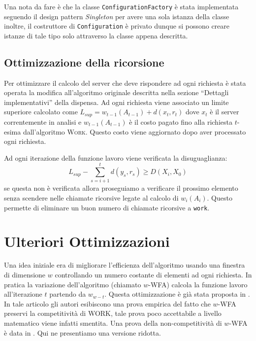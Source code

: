 \documentclass[a4paper, 10pt]{article}
\begin{document}
Una nota da fare è che la classe \texttt{ConfigurationFactory} è stata 
implementata seguendo il design pattern \emph{Singleton} per avere una sola
istanza della classe inoltre, il costruttore di \texttt{Configuration} è 
privato dunque si possono creare istanze di tale tipo solo attraverso la 
classe appena descritta. 

\subsection{Ottimizzazione della ricorsione}
Per ottimizzare il calcolo del server che deve rispondere ad ogni richiesta 
è stata operata la modifica all'algoritmo originale descritta nella sezione
``Dettagli implementativi'' della dispensa. Ad ogni richiesta viene associato
un limite superiore calcolato come $L_{sup} = w_{t - 1}(A_{t - 1}) + d(x_t, r_t)$ 
dove $x_t$ è il server correntemente in analisi e $w_{t - 1}(A_{t - 1})$ è il
costo pagato fino alla richiesta $t$-esima dall'algoritmo \textsc{Work}. Questo
costo viene aggiornato dopo aver processato ogni richiesta. 

Ad ogni iterazione della funzione lavoro viene verificata la disuguaglianza:
\[
  L_{sup} - \sum_{s = i + 1}^{t} d(y_s, r_s) \geq D(X_i, X_0)
\]
se questa non è verificata allora proseguiamo a verificare il prossimo elemento
senza scendere nelle chiamate ricorsive legate al calcolo di $w_i(A_i)$. Questo
permette di eliminare un buon numero di chiamate ricorsive a \texttt{work}. 

\section{Ulteriori Ottimizzazioni}
Una idea iniziale era di migliorare l'efficienza dell'algoritmo usando una 
finestra di dimensione $w$ controllando un numero costante di elementi 
ad ogni richiesta. In pratica la variazione dell'algoritmo (chiamato $w$-WFA) 
calcola la funzione lavoro all'iterazione $t$ partendo da $w_{w - t}$. Questa 
ottimizzazione è già stata proposta in \cite{baumgartner}. In tale articolo 
gli autori esibiscono una prova empirica del fatto che $w$-WFA preservi la 
competitività di \textsc{WORK}, tale prova poco accettabile a livello matematico
viene infatti smentita. Una prova della non-competitività di $w$-WFA è data in
\cite{rudec}. Qui ne presentiamo una versione ridotta. 
\end{document}
